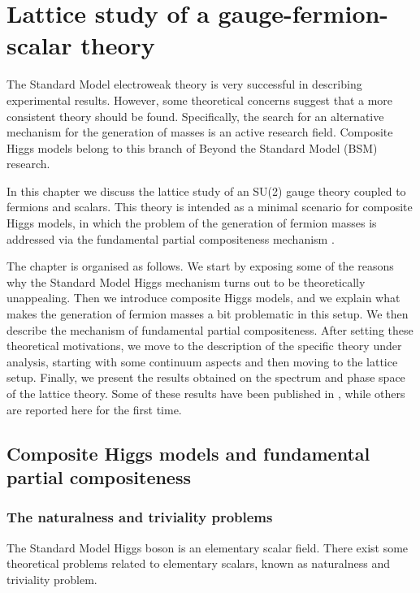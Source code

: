 \chapter{Lattice study of a gauge-fermion-scalar theory}

The Standard Model electroweak theory is very successful in describing experimental results. However, some theoretical concerns suggest that a more consistent theory should be found. Specifically, the search for an alternative mechanism for the generation of masses is an active research field.
Composite Higgs models belong to this branch of Beyond the Standard Model (BSM) research.

In this chapter we discuss the lattice study of an SU(2) gauge theory coupled to fermions and scalars. This theory is intended as a minimal scenario for composite Higgs models, in which the problem of the generation of fermion masses is addressed via the fundamental partial compositeness mechanism \cite{Sannino:2016sfx}. 

The chapter is organised as follows. We start by exposing some of the reasons why the Standard Model Higgs mechanism turns out to be theoretically unappealing. Then we introduce composite Higgs models, and we explain what makes the generation of fermion masses a bit problematic in this setup. We then describe the mechanism of fundamental partial compositeness.
After setting these theoretical motivations, we move to the description of the specific theory under analysis, starting with some continuum aspects and then moving to the lattice setup. Finally,  we present the results obtained on the spectrum and phase space of the lattice theory. Some of these results have been published in \cite{Hansen:2017mrt}, while others are reported here for the first time.



\section{Composite Higgs models and fundamental partial compositeness}


\subsection{The naturalness and triviality problems}

The Standard Model Higgs boson is an elementary scalar field. There exist some theoretical problems related to elementary scalars, known as naturalness and triviality problem. 

